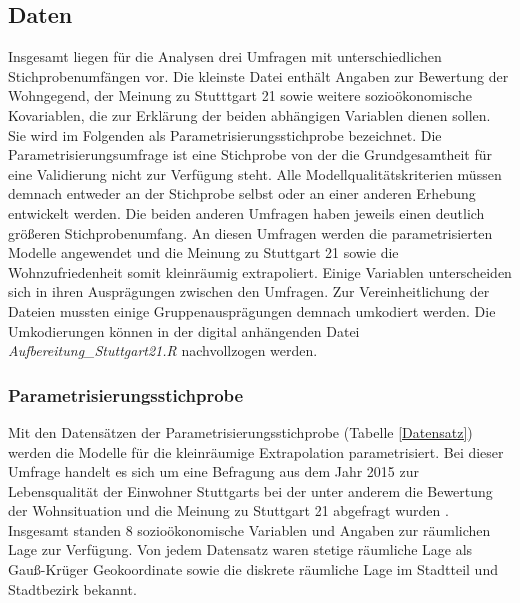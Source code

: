 \documentclass{Vorlage}
\begin{document}
\subsection{Daten}
Insgesamt liegen für die Analysen drei Umfragen mit unterschiedlichen Stichprobenumfängen vor. Die kleinste Datei 
enthält Angaben zur Bewertung der Wohngegend, der Meinung zu Stutttgart 21 sowie weitere sozioökonomische Kovariablen, 
die zur Erklärung der beiden abhängigen Variablen dienen sollen. Sie wird im Folgenden als 
Parametrisierungsstichprobe bezeichnet. Die Parametrisierungsumfrage ist eine Stichprobe von 
der die Grundgesamtheit für eine Validierung nicht zur Verfügung steht. Alle Modellqualitätskriterien müssen 
demnach entweder an der Stichprobe selbst oder an einer anderen Erhebung entwickelt werden. Die beiden anderen 
Umfragen haben jeweils einen deutlich größeren Stichprobenumfang. An diesen Umfragen werden die parametrisierten 
Modelle angewendet und die Meinung zu Stuttgart 21 sowie die Wohnzufriedenheit somit kleinräumig extrapoliert. Einige 
Variablen unterscheiden sich in ihren Ausprägungen zwischen den Umfragen. Zur Vereinheitlichung der Dateien mussten 
einige Gruppenausprägungen demnach umkodiert werden. Die Umkodierungen können in der digital anhängenden Datei 
\textit{Aufbereitung\_Stuttgart21.R} nachvollzogen werden.

\subsubsection{Parametrisierungsstichprobe}
Mit den Datensätzen der Parametrisierungsstichprobe (Tabelle \ref{Datensatz}) werden die Modelle für die kleinräumige 
Extrapolation parametrisiert. Bei dieser Umfrage handelt es sich um eine Befragung aus dem Jahr 2015 zur Lebensqualität 
der Einwohner Stuttgarts bei der unter anderem die Bewertung der Wohnsituation und die Meinung zu Stuttgart 21 abgefragt 
wurden \cite{Stuttgart2015}. Insgesamt standen 8 sozioökonomische Variablen und Angaben zur räumlichen Lage zur 
Verfügung. Von jedem Datensatz waren stetige räumliche Lage als Gauß-Krüger Geokoordinate sowie die diskrete räumliche 
Lage im Stadtteil und Stadtbezirk bekannt.\\
\end{document}
